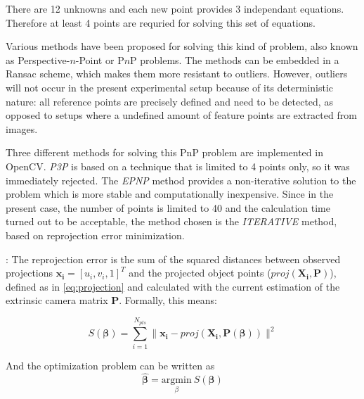There are 12 unknowns and each new point provides 3 independant equations. Therefore at least 4 points are requried for solving this set of equations. 

Various methods have been proposed for solving this kind of problem, also known as Perspective-$n$-Point or P$n$P problems. 
The methods can be embedded in a Ransac scheme, which makes them more resistant to outliers. However, outliers will not occur in the present experimental setup because of its deterministic nature: all reference points are precisely defined and need to be detected, as opposed to setups where a undefined amount of feature points are extracted from images.

Three different methods for solving this PnP problem are implemented in OpenCV.
\textit{P3P} is based on a technique that is limited to 4 points only, so it was immediately rejected. The \textit{EPNP} method \cite{Lepetit2009} provides a non-iterative solution to the problem which is more stable and computationally inexpensive. Since in the present case, the number of points is limited to 40 and the calculation time turned out to be acceptable, the method chosen is the \textit{ITERATIVE} method, based on reprojection error minimization.

:
The reprojection error is the sum of the squared distances between observed projections $\mathbf{x_i}=[u_i,v_i,1]^T$ and the projected object points ($proj(\mathbf{X_i},\mathbf{P})$), defined as in \eqref{eq:projection} and calculated with the current estimation of the extrinsic camera matrix $\mathbf{P}$. Formally, this means:

\begin{equation}
S(\boldsymbol\beta) = \sum_{i=1}^{N_{pts}} \| \mathbf{x_i}-proj(\mathbf{X_i},\mathbf{P}(\boldsymbol\beta)) \| ^2
\end{equation}

And the optimization problem can be written as
\begin{equation}
    \hat{\boldsymbol\beta} = \underset{\beta} {\mathrm{argmin}} ~S(\boldsymbol\beta)
\end{equation}

